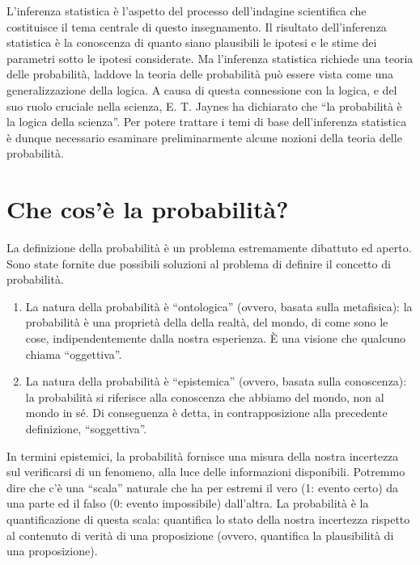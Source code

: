 \documentclass[
  11pt,
]{krantz}
\theoremstyle{definition}
\theoremstyle{definition}
\theoremstyle{definition}
\theoremstyle{definition}
\theoremstyle{remark}
\begin{document}
L'inferenza statistica è l'aspetto del processo dell'indagine scientifica che costituisce il tema centrale di questo insegnamento. Il risultato dell'inferenza statistica è la conoscenza di quanto siano plausibili le ipotesi e le stime dei parametri sotto le ipotesi considerate. Ma l'inferenza statistica richiede una teoria delle probabilità, laddove la teoria delle probabilità può essere vista come una generalizzazione della logica. A causa di questa connessione con la logica, e del suo ruolo cruciale nella scienza, E. T. Jaynes ha dichiarato che ``la probabilità è la logica della scienza''. Per potere trattare i temi di base dell'inferenza statistica è dunque necessario esaminare preliminarmente alcune nozioni della teoria delle probabilità.

\hypertarget{che-cosuxe8-la-probabilituxe0}{%
\section{Che cos'è la probabilità?}\label{che-cosuxe8-la-probabilituxe0}}

La definizione della probabilità è un problema estremamente dibattuto ed aperto. Sono state fornite due possibili soluzioni al problema di definire il concetto di probabilità.

\begin{enumerate}
\def\labelenumi{(\alph{enumi})}
\item
  La natura della probabilità è ``ontologica'' (ovvero, basata sulla metafisica): la probabilità è una proprietà della della realtà, del mondo, di come sono le cose, indipendentemente dalla nostra esperienza. È una visione che qualcuno chiama ``oggettiva''.
\item
  La natura della probabilità è ``epistemica'' (ovvero, basata sulla conoscenza): la probabilità si riferisce alla conoscenza che abbiamo del mondo, non al mondo in sé. Di conseguenza è detta, in contrapposizione alla precedente definizione, ``soggettiva''.
\end{enumerate}

In termini epistemici, la probabilità fornisce una misura della nostra incertezza sul verificarsi di un fenomeno, alla luce delle informazioni disponibili. Potremmo dire che c'è una ``scala'' naturale che ha per estremi il vero (1: evento certo) da una parte ed il falso (0: evento impossibile) dall'altra. La probabilità è la quantificazione di questa scala: quantifica lo stato della nostra incertezza rispetto al contenuto di verità di una proposizione (ovvero, quantifica la plausibilità di una proposizione).
\end{document}
